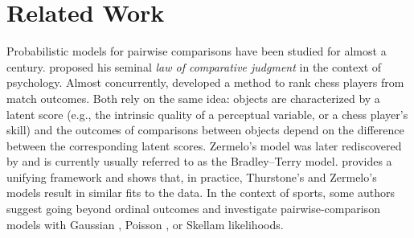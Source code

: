 \section{Related Work}
\label{kks:sec:relwork}

Probabilistic models for pairwise comparisons have been studied for almost a century.
\citet{thurstone1927law} proposed his seminal \emph{law of comparative judgment} in the context of psychology.
Almost concurrently, \citet{zermelo1928berechnung} developed a method to rank chess players from match outcomes.
Both rely on the same idea: objects are characterized by a latent score (e.g., the intrinsic quality of a perceptual variable, or a chess player's skill) and the outcomes of comparisons between objects depend on the difference between the corresponding latent scores.
Zermelo's model was later rediscovered by \citet{bradley1952rank} and is currently usually referred to as the Bradley--Terry model.
\citet{stern1992all} provides a unifying framework and shows that, in practice, Thurstone's and Zermelo's models result in similar fits to the data.
In the context of sports, some authors suggest going beyond ordinal outcomes and investigate pairwise-comparison models with Gaussian \citep{guo2012score}, Poisson \citep{maher1982modelling, guo2012score}, or Skellam \citep{karlis2009bayesian} likelihoods.


